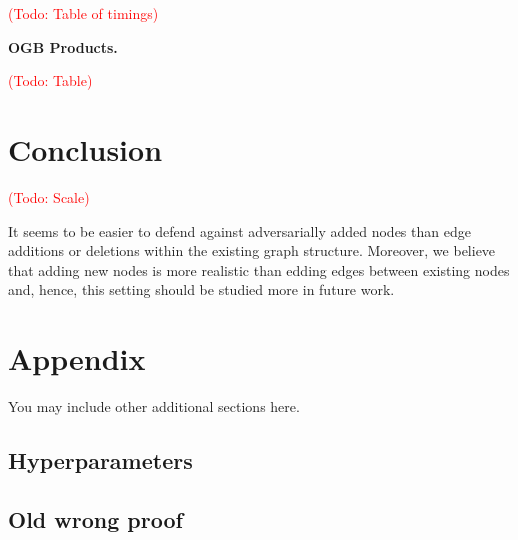 \documentclass{article} %
\newcommand{\todo}[1]{\textcolor{red}{(Todo: #1)}}
\begin{document}
\todo{Table of timings}

\textbf{OGB Products.} 

\todo{Table}

\section{Conclusion}\label{sec:conclusion} %

\todo{Scale}

It seems to be easier to defend against adversarially added nodes than edge additions or deletions within the existing graph structure. Moreover, we believe that adding new nodes is more realistic than edding edges between existing nodes and, hence, this setting should be studied more in future work.





\appendix
\section{Appendix}
You may include other additional sections here.

\subsection{Hyperparameters}\label{sec:appendix_hyperparams}

\subsection{Old wrong proof}
\end{document}
